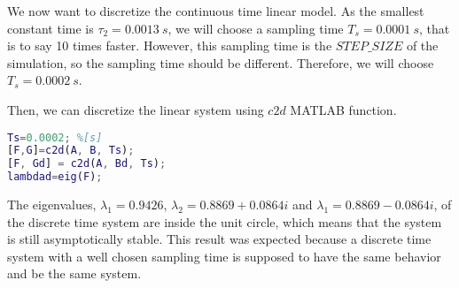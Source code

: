 We now want to discretize the continuous time linear model. As the smallest constant time is $\tau_2=0.0013\ s$, we will choose a sampling time $T_s=0.0001\ s$, that is to say 10 times faster. However, this sampling time is the $STEP\_SIZE$ of the simulation, so the sampling time should be different. Therefore, we will choose $T_s=0.0002\ s$.

Then, we can discretize the linear system using $c2d$ MATLAB function.

\begin{lstlisting}[language=Matlab]
Ts=0.0002; %[s]
[F,G]=c2d(A, B, Ts);
[F, Gd] = c2d(A, Bd, Ts);
lambdad=eig(F);
\end{lstlisting}

The eigenvalues, $\lambda_1=0.9426$, $\lambda_2=0.8869+0.0864i$ and $\lambda_1=0.8869-0.0864i$, of the discrete time system are inside the unit circle, which means that the system is still asymptotically stable. This result was expected because a discrete time system with a well chosen sampling time is supposed to have the same behavior and be the same system.